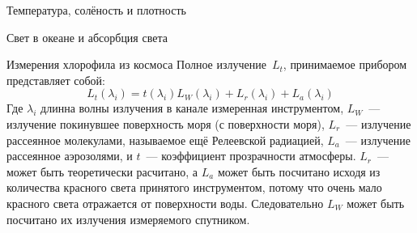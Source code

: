 \begin{chapter}{Температура, солёность и плотность}
\begin{section}{Свет в океане и абсорбция света}
\begin{paragraph}{Измерения хлорофила из космоса}
Полное излучение~$L_t$,
принимаемое прибором представляет собой:
\begin{equation}
 L_t(\lambda_i) = t(\lambda_i)L_W(\lambda_i) + L_r(\lambda_i) + L_a(\lambda_i)
\end{equation}
Где $\lambda_i$ длинна волны излучения в канале измеренная
инструментом, $L_W$~--- излучение покинувшее поверхность моря (с
поверхности моря), $L_r$~--- излучение рассеянное молекулами,
называемое ещё Релеевской радиацией, $L_a$~--- излучение рассеянное
аэрозолями, и $t$~--- коэффициент прозрачности атмосферы. $L_r$~---
может быть теоретически расчитано, а $L_a$ может быть посчитано исходя
из количества красного света принятого инструментом, потому что очень
мало красного света отражается от поверхности воды. Следовательно
$L_W$ может быть посчитано их излучения измеряемого спутником. 
%


\end{paragraph}
\end{section}
\end{chapter}

